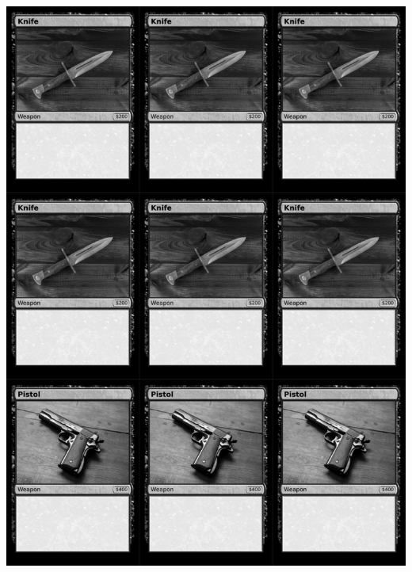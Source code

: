 \documentclass[a4paper]{article}
\begin{document}
\newpage

\begin{center}
	\centering
	\includegraphics[width=200.5mm,height=280.7mm]{output/temp/page6.png}
\end{center}
\end{document}
